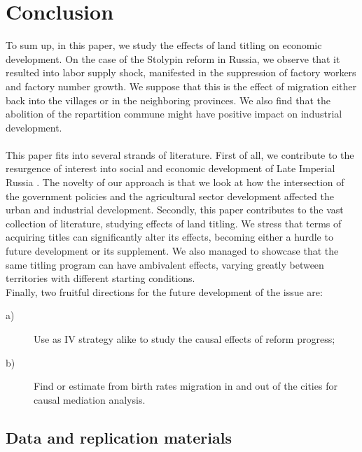 \documentclass[a4paper, 12pt]{article}
\begin{document}
\section{Conclusion}    
    
    \noindent  To sum up, in this paper, we study the effects of land titling on economic development. On the case of the Stolypin reform in Russia, we observe that it resulted into labor supply shock, manifested in the suppression of factory workers and factory number growth. We suppose that this is the effect of migration either back into the villages or in the neighboring provinces. We also find that the abolition of the repartition commune might have positive impact on industrial development.
    \\\\
    This paper fits into several strands of literature. First of all, we contribute to the resurgence of interest into social and economic development of Late Imperial Russia \cite{mir2010, castaneda2019stolypin, markevich2018economic, gur2021}. The novelty of our approach is that we look at how the intersection of the government policies and the agricultural sector development affected the urban and industrial development. Secondly, this paper contributes to the vast collection of literature, studying effects of land titling\cite{galiani2010property, subramanian2019institution, hua}. We stress that terms of acquiring titles can significantly alter its effects, becoming either a hurdle to future development or its supplement. We also managed to showcase that the same titling program can have ambivalent effects, varying greatly between territories with different starting conditions. 
    \\
    
    
    \noindent Finally, two fruitful directions for the future development of the issue are:
    \begin{description}
        
        \item[a)] Use as IV strategy alike \cite{chernina2014property, castaneda2019stolypin} to study the causal effects of reform progress;
        
        \item[b)] Find or estimate from birth rates migration in and out of the cities for causal mediation analysis.
        
    \end{description}
    
\subsection*{Data and replication materials}
    
\end{document}
